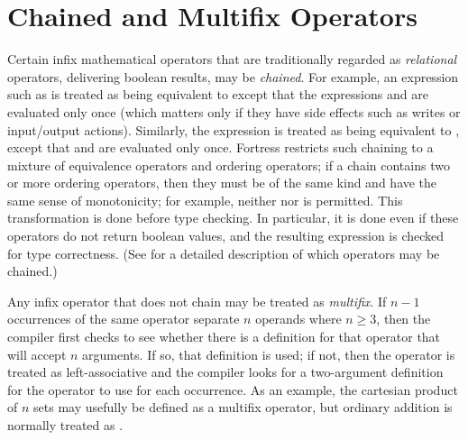 %
%
%
%

\section{Chained and Multifix Operators}

Certain infix mathematical operators that are traditionally regarded as \emph{relational}
operators, delivering boolean results, may be \emph{chained}.  For example,
an expression such as 
is treated as being equivalent to
except that the expressions  and  are evaluated only once
(which matters only if they have side effects such as writes or
input/output actions).
Similarly, the expression 
  is treated as being equivalent to
  ,
  except that  and  are evaluated only once.
Fortress restricts such chaining to a mixture of equivalence
  operators and ordering operators; if a chain contains two or
  more ordering operators, then they must be of the same
  kind and have the same sense of monotonicity;
for example, neither  nor 
is permitted.
This transformation is done before type checking.
In particular, it is done even if these operators do not return
boolean values, and the resulting expression is checked for type
correctness.
(See  for a detailed description of which
operators may be chained.)


Any infix operator that does not chain may be treated as \emph{multifix}.
If $n-1$ occurrences of the same operator separate $n$ operands where
$n \geq 3$,
then the compiler first checks to see whether there is a definition
for that operator that will accept $n$ arguments.  If so, that definition is used;
if not, then the operator is treated as left-associative and the compiler
looks for a two-argument definition for the operator to use for each occurrence.
As an example, the cartesian product
of $n$ sets may usefully be defined as a multifix operator, but
ordinary addition
 is normally treated as .
